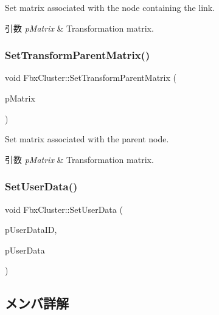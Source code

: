 Set matrix associated with the node containing the link. 
\begin{DoxyParams}{引数}
{\em p\+Matrix} & Transformation matrix. \\
\hline
\end{DoxyParams}
\mbox{\label{class_fbx_cluster_a900f6774195ee098f945aa1d07a4a283}} 
\subsubsection{\texorpdfstring{Set\+Transform\+Parent\+Matrix()}{SetTransformParentMatrix()}}
{\footnotesize\ttfamily void Fbx\+Cluster\+::\+Set\+Transform\+Parent\+Matrix (\begin{DoxyParamCaption}\item[{const \hyperlink{class_fbx_a_matrix}{Fbx\+A\+Matrix} \&}]{p\+Matrix }\end{DoxyParamCaption})}

Set matrix associated with the parent node. 
\begin{DoxyParams}{引数}
{\em p\+Matrix} & Transformation matrix. \\
\hline
\end{DoxyParams}
\mbox{\label{class_fbx_cluster_a8b2707b5d49a1e3e565884056df011f0}} 
\subsubsection{\texorpdfstring{Set\+User\+Data()}{SetUserData()}}
{\footnotesize\ttfamily void Fbx\+Cluster\+::\+Set\+User\+Data (\begin{DoxyParamCaption}\item[{const char $\ast$}]{p\+User\+Data\+ID,  }\item[{const char $\ast$}]{p\+User\+Data }\end{DoxyParamCaption})}



\subsection{メンバ詳解}
\mbox{\label{class_fbx_cluster_a96b44a5dd28301425c0412b3cf4ea729}} 
